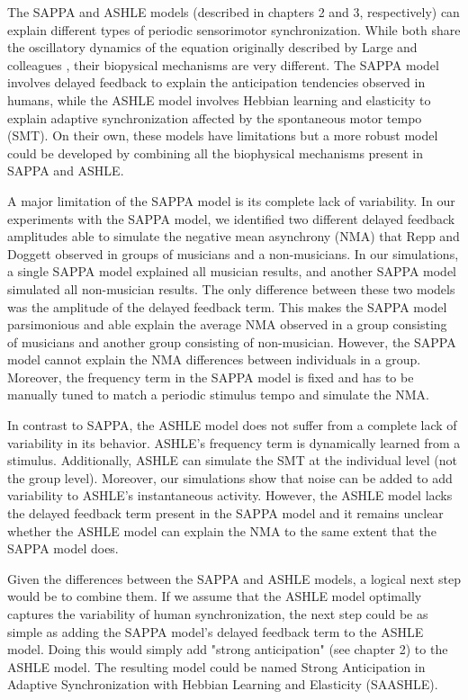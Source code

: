 \documentclass{report}
\begin{document}
The SAPPA and ASHLE models (described in chapters 2 and 3, respectively) can explain different types of periodic sensorimotor synchronization. While both share the oscillatory dynamics of the equation originally described by Large and colleagues \cite{large2010canonical}, their biopysical mechanisms are very different. The SAPPA model involves delayed feedback to explain the anticipation tendencies observed in humans, while the ASHLE model involves Hebbian learning and elasticity to explain adaptive synchronization affected by the spontaneous motor tempo (SMT). On their own, these models have limitations but a more robust model could be developed by combining all the biophysical mechanisms present in SAPPA and ASHLE.

A major limitation of the SAPPA model is its complete lack of variability. In our experiments with the SAPPA model, we identified two different delayed feedback amplitudes able to simulate the negative mean asynchrony (NMA) that Repp and Doggett \cite{repp2007tapping} observed in groups of musicians and a non-musicians. In our simulations, a single SAPPA model explained all musician results, and another SAPPA model simulated all non-musician results. The only difference between these two models was the amplitude of the delayed feedback term. This makes the SAPPA model parsimonious and able explain the average NMA observed in a group consisting of musicians and another group consisting of non-musician. However, the SAPPA model cannot explain the NMA differences between individuals in a group. Moreover, the frequency term in the SAPPA model is fixed and has to be manually tuned to match a periodic stimulus tempo and simulate the NMA. 

In contrast to SAPPA, the ASHLE model does not suffer from a complete lack of variability in its behavior. ASHLE's frequency term is dynamically learned from a stimulus. Additionally, ASHLE can simulate the SMT at the individual level (not the group level). Moreover, our simulations show that noise can be added to add variability to ASHLE's instantaneous activity. However, the ASHLE model lacks the delayed feedback term present in the SAPPA model and it remains unclear whether the ASHLE model can explain the NMA to the same extent that the SAPPA model does. 

Given the differences between the SAPPA and ASHLE models, a logical next step would be to combine them. If we assume that the ASHLE model optimally captures the variability of human synchronization, the next step could be as simple as adding the SAPPA model's delayed feedback term to the ASHLE model. Doing this would simply add "strong anticipation" (see chapter 2) to the ASHLE model. The resulting model could be named Strong Anticipation in Adaptive Synchronization with Hebbian Learning and Elasticity (SAASHLE). 
\end{document}
